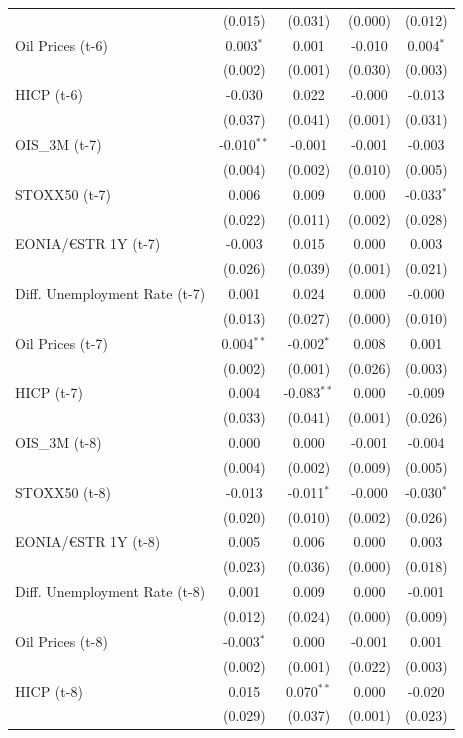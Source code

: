 \begin{longtable}[t]{lcccc}
 & (0.015) & (0.031) & (0.000) & (0.012)\\
Oil Prices (t-6) & 0.003$^{*}$ & 0.001 & -0.010 & 0.004$^{*}$\\
 & (0.002) & (0.001) & (0.030) & (0.003)\\
HICP (t-6) & -0.030 & 0.022 & -0.000 & -0.013\\
 & (0.037) & (0.041) & (0.001) & (0.031)\\
OIS\_3M (t-7) & -0.010$^{**}$ & -0.001 & -0.001 & -0.003\\
 & (0.004) & (0.002) & (0.010) & (0.005)\\
STOXX50 (t-7) & 0.006 & 0.009 & 0.000 & -0.033$^{*}$\\
 & (0.022) & (0.011) & (0.002) & (0.028)\\
EONIA/€STR 1Y (t-7) & -0.003 & 0.015 & 0.000 & 0.003\\
 & (0.026) & (0.039) & (0.001) & (0.021)\\
Diff. Unemployment Rate (t-7) & 0.001 & 0.024 & 0.000 & -0.000\\
 & (0.013) & (0.027) & (0.000) & (0.010)\\
Oil Prices (t-7) & 0.004$^{**}$ & -0.002$^{*}$ & 0.008 & 0.001\\
 & (0.002) & (0.001) & (0.026) & (0.003)\\
HICP (t-7) & 0.004 & -0.083$^{**}$ & 0.000 & -0.009\\
 & (0.033) & (0.041) & (0.001) & (0.026)\\
OIS\_3M (t-8) & 0.000 & 0.000 & -0.001 & -0.004\\
 & (0.004) & (0.002) & (0.009) & (0.005)\\
STOXX50 (t-8) & -0.013 & -0.011$^{*}$ & -0.000 & -0.030$^{*}$\\
 & (0.020) & (0.010) & (0.002) & (0.026)\\
EONIA/€STR 1Y (t-8) & 0.005 & 0.006 & 0.000 & 0.003\\
 & (0.023) & (0.036) & (0.000) & (0.018)\\
Diff. Unemployment Rate (t-8) & 0.001 & 0.009 & 0.000 & -0.001\\
 & (0.012) & (0.024) & (0.000) & (0.009)\\
Oil Prices (t-8) & -0.003$^{*}$ & 0.000 & -0.001 & 0.001\\
 & (0.002) & (0.001) & (0.022) & (0.003)\\
HICP (t-8) & 0.015 & 0.070$^{**}$ & 0.000 & -0.020\\
 & (0.029) & (0.037) & (0.001) & (0.023)\\

\end{longtable}
